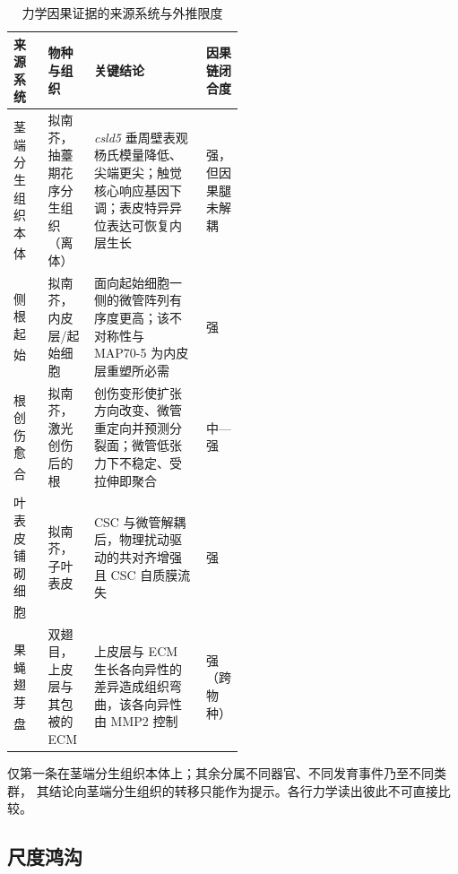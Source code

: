 \documentclass[11pt,a4paper]{ctexart}
\begin{document}
\begin{table}[htbp]
  \centering
  \caption{力学因果证据的来源系统与外推限度}
  \label{tab:extrapolation}
  \footnotesize
  \renewcommand{\arraystretch}{1.3}
  \setlength{\tabcolsep}{4pt}
  \begin{tabularx}{\linewidth}{@{}>{\raggedright\arraybackslash}p{0.155\linewidth}
                                        >{\raggedright\arraybackslash}p{0.20\linewidth}
                                        >{\raggedright\arraybackslash}X
                                        >{\raggedright\arraybackslash}p{0.155\linewidth}@{}}
    \toprule
    \textbf{来源系统} & \textbf{物种与组织} & \textbf{关键结论} & \textbf{因果链闭合度} \\
    \midrule
    茎端分生组织本体\textsuperscript{\cite{ref16}}
      & 拟南芥，抽薹期花序分生组织（离体）
      & \textit{csld5} 垂周壁表观杨氏模量降低、尖端更尖；触觉核心响应基因下调；表皮特异异位表达可恢复内层生长
      & 强，但因果腿未解耦 \\
    侧根起始\textsuperscript{\cite{ref15}}
      & 拟南芥，内皮层/起始细胞
      & 面向起始细胞一侧的微管阵列有序度更高；该不对称性与 MAP70-5 为内皮层重塑所必需
      & 强 \\
    根创伤愈合\textsuperscript{\cite{ref17}}
      & 拟南芥，激光创伤后的根
      & 创伤变形使扩张方向改变、微管重定向并预测分裂面；微管低张力下不稳定、受拉伸即聚合
      & 中—强 \\
    叶表皮铺砌细胞\textsuperscript{\cite{ref14}}
      & 拟南芥，子叶表皮
      & CSC 与微管解耦后，物理扰动驱动的共对齐增强且 CSC 自质膜流失
      & 强 \\
    果蝇翅芽盘\textsuperscript{\cite{ref18}}
      & 双翅目，上皮层与其包被的 ECM
      & 上皮层与 ECM 生长各向异性的差异造成组织弯曲，该各向异性由 MMP2 控制
      & 强（跨物种） \\
    \bottomrule
  \end{tabularx}
  \begin{minipage}{\linewidth}\vspace{2pt}\footnotesize
  仅第一条在茎端分生组织本体上；其余分属不同器官、不同发育事件乃至不同类群，
  其结论向茎端分生组织的转移只能作为提示。各行力学读出彼此不可直接比较。
  \end{minipage}
\end{table}

\subsection{尺度鸿沟}
\end{document}
